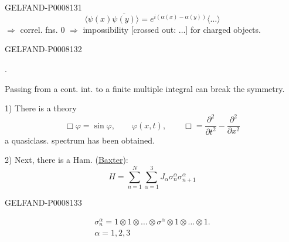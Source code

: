 \begin{GelfandAdjacentEvidence}{GELFAND-P000813}{1}
\[
\langle\psi(x)\overline{\psi(y)}\rangle
=e^{i(\alpha(x)-\alpha(y))}\langle\ldots\rangle
\]
\(\Rightarrow\) correl. fns. \(0\) \(\Rightarrow\) impossibility
[crossed out: \(\ldots\)] for charged objects.
\end{GelfandAdjacentEvidence}
\begin{GelfandAdjacentEvidence}{GELFAND-P000813}{2}


.

Passing from a cont. int. to a finite multiple integral can break the symmetry.

1) There is a theory
\[
\Box\varphi=\sin\varphi,\qquad \varphi(x,t),\qquad
\Box=\frac{\partial^2}{\partial t^2}-\frac{\partial^2}{\partial x^2}
\]
a quasiclass. spectrum has been obtained.

2) Next, there is a Ham. (\uline{Baxter}):
\begin{equation*}
H=\sum_{n=1}^N\sum_{\alpha=1}^3 J_\alpha\sigma_n^\alpha\sigma_{n+1}^\alpha \tag{1}
\end{equation*}

\end{GelfandAdjacentEvidence}
\begin{GelfandAdjacentEvidence}{GELFAND-P000813}{3}


\[
\begin{gathered}
\sigma_n^\alpha=1\otimes1\otimes\ldots\otimes
\sigma^\alpha\otimes1\otimes\ldots\otimes1.\\
\alpha=1,2,3
\end{gathered}
\]
\end{GelfandAdjacentEvidence}
